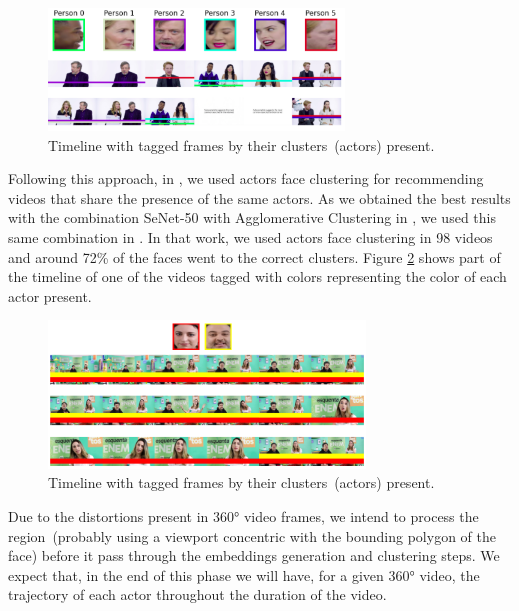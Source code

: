 \begin{figure}[!ht]
    \centering
    \includegraphics[width=0.7\textwidth]{img/timeline2.png}
    \caption{Timeline with tagged frames by their clusters~(actors) present.}
    \label{fig:timeline1}
\end{figure}



Following this approach, in \cite{mendes2020ISM}, we used actors face clustering for recommending videos that share the presence of the same actors. As we obtained the best results with the combination SeNet-50 with Agglomerative Clustering in \cite{mendes2020cluster}, we used this same combination in \cite{mendes2020ISM}. 
In that work, we used actors face clustering in 98 videos and around 72\% of the faces went to the correct clusters. Figure \ref{fig:timeline2} shows part of the timeline of one of the videos tagged with colors representing the color of each actor present.

\begin{figure}[!ht]
    \centering
    \includegraphics[width=0.75\textwidth]{img/educational_timeline2.png}
    \caption{Timeline with tagged frames by their clusters~(actors) present.}
    \label{fig:timeline2}
\end{figure}

Due to the distortions present in 360° video frames, we intend to process the region~(probably using a viewport concentric with the bounding polygon of the face) before it pass through the embeddings generation and clustering steps. We expect that, in the end of this phase we will have, for a given 360° video, the trajectory of each actor throughout the duration of the video.

